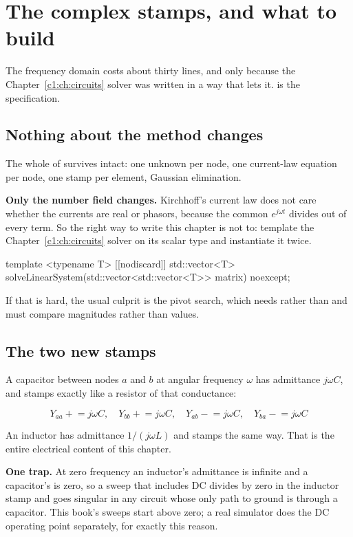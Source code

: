 
\section{The complex stamps, and what to build}
\label{c2:app:b}

The frequency domain costs about thirty lines, and only because the Chapter~\ref{c1:ch:circuits} solver was written in a way that lets it.  is the specification.

\subsection{Nothing about the method changes}
\label{c2:sec:b1}
The whole of  survives intact: one unknown per node, one current-law equation per node, one stamp per element, Gaussian elimination.

\textbf{Only the number field changes.} Kirchhoff's current law does not care whether the currents are real or phasors, because the common $e^{j\omega t}$ divides out of every term. So the right way to write this chapter is not to: template the Chapter~\ref{c1:ch:circuits} solver on its scalar type and instantiate it twice.

\begin{cppcode}
template <typename T>
[[nodiscard]] std::vector<T> solveLinearSystem(std::vector<std::vector<T>> matrix) noexcept;
\end{cppcode}

If that is hard, the usual culprit is the pivot search, which needs  rather than  and must compare magnitudes rather than values.

\subsection{The two new stamps}
\label{c2:sec:b2}
A capacitor between nodes $a$ and $b$ at angular frequency $\omega$ has admittance $j\omega C$, and stamps exactly like a resistor of that conductance:

\[
  Y_{aa} \mathrel{+}= j\omega C, \quad Y_{bb} \mathrel{+}= j\omega C, \quad Y_{ab} \mathrel{-}= j\omega C, \quad Y_{ba} \mathrel{-}= j\omega C
\]

An inductor has admittance $1/(j\omega L)$ and stamps the same way. That is the entire electrical content of this chapter.

\textbf{One trap.} At zero frequency an inductor's admittance is infinite and a capacitor's is zero, so a sweep that includes DC divides by zero in the inductor stamp and goes singular in any circuit whose only path to ground is through a capacitor. This book's sweeps start above zero; a real simulator does the DC operating point separately, for exactly this reason.

